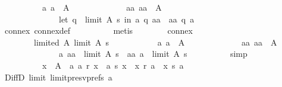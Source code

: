 \begin{isabellebody}
\ \ \ \ \ \ \ \ \ \ {\isacharparenleft}{\kern0pt}{\isasymforall}a{\isachardot}{\kern0pt}\ a\ {\isasymnotin}\ A\ {\isasymor}\isanewline
\ \ \ \ \ \ \ \ \ \ \ \ {\isacharparenleft}{\kern0pt}{\isasymforall}aa{\isachardot}{\kern0pt}\ aa\ {\isasymnotin}\ A\ {\isasymor}\isanewline
\ \ \ \ \ \ \ \ \ \ \ \ \ \ {\isacharparenleft}{\kern0pt}let\ q\ {\isacharequal}{\kern0pt}\ limit\ A\ s\ in\ a\ {\isasympreceq}\isactrlsub q\ aa\ {\isasymor}\ aa\ {\isasympreceq}\isactrlsub q\ a{\isacharparenright}{\kern0pt}{\isacharparenright}{\kern0pt}{\isacharparenright}{\kern0pt}{\isachardoublequoteclose}\isanewline
\ \ \ \ \ \ \ \ \isamarkupfalse%
\ connex\ connex{\isacharunderscore}{\kern0pt}def\isanewline
\ \ \ \ \ \ \ \ \isamarkupfalse%
\ metis\isanewline
\ \ \ \ \ \ \isamarkupfalse%
\ connex{}{\isacharcolon}{\kern0pt}\isanewline
\ \ \ \ \ \ \ \ {\isachardoublequoteopen}limited\ A\ {\isacharparenleft}{\kern0pt}limit\ A\ s{\isacharparenright}{\kern0pt}\ {\isasymand}\isanewline
\ \ \ \ \ \ \ \ \ \ {\isacharparenleft}{\kern0pt}{\isasymforall}a{\isachardot}{\kern0pt}\ a\ {\isasymnotin}\ A\ {\isasymor}\isanewline
\ \ \ \ \ \ \ \ \ \ \ \ {\isacharparenleft}{\kern0pt}{\isasymforall}aa{\isachardot}{\kern0pt}\ aa\ {\isasymnotin}\ A\ {\isasymor}\isanewline
\ \ \ \ \ \ \ \ \ \ \ \ \ \ {\isacharparenleft}{\kern0pt}{\isacharparenleft}{\kern0pt}a{\isacharcomma}{\kern0pt}\ aa{\isacharparenright}{\kern0pt}\ {\isasymin}\ limit\ A\ s\ {\isasymor}\ {\isacharparenleft}{\kern0pt}aa{\isacharcomma}{\kern0pt}\ a{\isacharparenright}{\kern0pt}\ {\isasymin}\ limit\ A\ s{\isacharparenright}{\kern0pt}{\isacharparenright}{\kern0pt}{\isacharparenright}{\kern0pt}{\isachardoublequoteclose}\isanewline
\ \ \ \ \ \ \ \ \isamarkupfalse%
\ simp\isanewline
\ \ \ \ \ \ \isamarkupfalse%
\ \isamarkupfalse%
\isanewline
\ \ \ \ \ \ \ \ \ \ {\isachardoublequoteopen}{\isasymforall}x\ {\isasymin}\ A\ {\isacharminus}{\kern0pt}\ {\isacharbraceleft}{\kern0pt}a{\isacharbraceright}{\kern0pt}{\isachardot}{\kern0pt}\ {\isacharparenleft}{\kern0pt}a\ {\isasympreceq}\isactrlsub r\ x\ {\isasymand}\ a\ {\isasympreceq}\isactrlsub s\ x{\isacharparenright}{\kern0pt}\ {\isasymor}\ {\isacharparenleft}{\kern0pt}x\ {\isasympreceq}\isactrlsub r\ a\ {\isasymand}\ x\ {\isasympreceq}\isactrlsub s\ a{\isacharparenright}{\kern0pt}{\isachardoublequoteclose}\isanewline
\ \ \ \ \ \ \ \ \isamarkupfalse%
\ DiffD{}\ limit{}\ limit{\isacharunderscore}{\kern0pt}presv{\isacharunderscore}{\kern0pt}prefs{}\ a{}\isanewline

\end{isabellebody}
